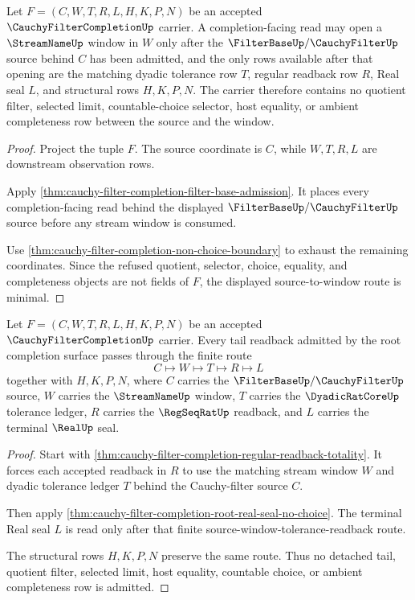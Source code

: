 \begin{theorem}
\label{thm:cauchy-filter-completion-filterbase-window-minimality}
Let $F=(C,W,T,R,L,H,K,P,N)$ be an accepted $\CauchyFilterCompletionUp$ carrier. A completion-facing read may open a $\StreamNameUp$ window in $W$ only after the $\FilterBaseUp/\CauchyFilterUp$ source behind $C$ has been admitted, and the only rows available after that opening are the matching dyadic tolerance row $T$, regular readback row $R$, Real seal $L$, and structural rows $H,K,P,N$. The carrier therefore contains no quotient filter, selected limit, countable-choice selector, host equality, or ambient completeness row between the source and the window.
\end{theorem}
\begin{proof}
Project the tuple $F$. The source coordinate is $C$, while $W,T,R,L$ are downstream observation rows.

Apply \autoref{thm:cauchy-filter-completion-filter-base-admission}. It places every completion-facing read behind the displayed $\FilterBaseUp/\CauchyFilterUp$ source before any stream window is consumed.

Use \autoref{thm:cauchy-filter-completion-non-choice-boundary} to exhaust the remaining coordinates. Since the refused quotient, selector, choice, equality, and completeness objects are not fields of $F$, the displayed source-to-window route is minimal.
\end{proof}

\begin{theorem}
\label{thm:cauchy-filter-completion-tail-readback-admission}
Let $F=(C,W,T,R,L,H,K,P,N)$ be an accepted $\CauchyFilterCompletionUp$ carrier. Every tail readback admitted by the root completion surface passes through the finite route
$$
C\longmapsto W\longmapsto T\longmapsto R\longmapsto L
$$
together with $H,K,P,N$, where $C$ carries the $\FilterBaseUp/\CauchyFilterUp$ source, $W$ carries the $\StreamNameUp$ window, $T$ carries the $\DyadicRatCoreUp$ tolerance ledger, $R$ carries the $\RegSeqRatUp$ readback, and $L$ carries the terminal $\RealUp$ seal.
\end{theorem}
\begin{proof}
Start with \autoref{thm:cauchy-filter-completion-regular-readback-totality}. It forces each accepted readback in $R$ to use the matching stream window $W$ and dyadic tolerance ledger $T$ behind the Cauchy-filter source $C$.

Then apply \autoref{thm:cauchy-filter-completion-root-real-seal-no-choice}. The terminal Real seal $L$ is read only after that finite source-window-tolerance-readback route.

The structural rows $H,K,P,N$ preserve the same route. Thus no detached tail, quotient filter, selected limit, host equality, countable choice, or ambient completeness row is admitted.
\end{proof}

